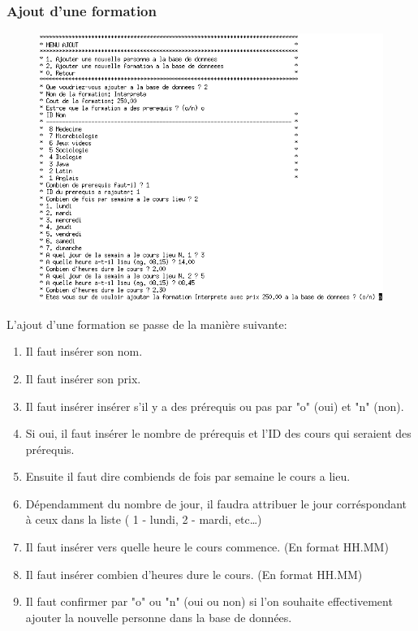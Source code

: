 \documentclass[11pt]{article}
\begin{document}
\subsubsection{Ajout d'une formation}
\begin{figure}[ht]
  \centering
  \includegraphics[scale=0.7]{images/11.png.png}
\end{figure}
L'ajout d'une formation se passe de la manière suivante:
\begin{enumerate}
\item Il faut insérer son nom.
\item Il faut insérer son prix.
\item Il faut insérer insérer s'il y a des prérequis ou pas par "o" (oui) et "n" (non).
\item Si oui, il faut insérer le nombre de prérequis et l'ID des cours qui seraient des prérequis.
\item Ensuite il faut dire combiends de fois par semaine le cours a lieu.
\item Dépendamment du nombre de jour, il faudra attribuer le jour corréspondant à ceux dans la liste ( 1 - lundi, 2 - mardi, etc\ldots)
\item Il faut insérer vers quelle heure le cours commence. (En format HH.MM)
\item Il faut insérer combien d'heures dure le cours. (En format HH.MM)
\item Il faut confirmer par "o" ou "n" (oui ou non) si l'on souhaite effectivement ajouter la nouvelle personne dans la base de données.
\end{enumerate}
\end{document}
